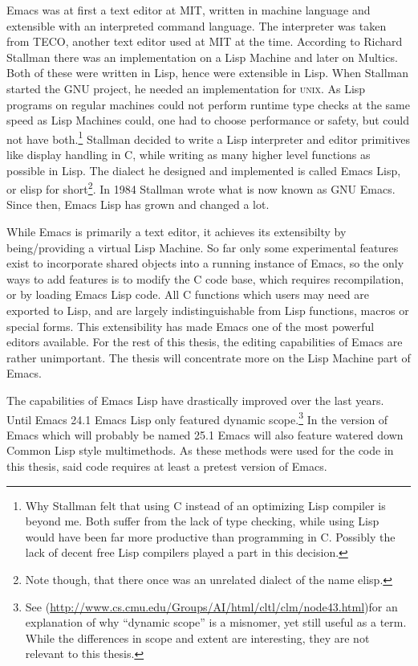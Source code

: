 \documentclass[a4paper,10pt,twoside]{article}
\newcommand{\el}{Emacs Lisp}
\newcommand{\cl}{Common Lisp}
\newcommand{\unix}{\textsc{unix}}
\begin{document}
Emacs was at first a text editor at MIT, written in machine language and
extensible with an interpreted command language.  The interpreter was taken from
TECO, another text editor used at MIT at the time.  According to Richard
Stallman \cite{emacs-hist} there was an implementation on a Lisp Machine and
later on Multics.  Both of these were written in Lisp, hence were extensible in
Lisp.  When Stallman started the GNU project, he needed an implementation for
\unix{}.  As Lisp programs on regular machines could not perform runtime type
checks at the same speed as Lisp Machines could, one had to choose performance
or safety, but could not have both.\footnote{Why Stallman felt that using C
  instead of an optimizing Lisp compiler is beyond me.  Both suffer from the
  lack of type checking, while using Lisp would have been far more productive
  than programming in C.  Possibly the lack of decent free Lisp compilers played
  a part in this decision.} Stallman decided to write a Lisp interpreter and
editor primitives like display handling in C, while writing as many higher level
functions as possible in Lisp.  The dialect he designed and implemented is
called \el{}, or elisp for short\footnote{Note though, that there once was an
  unrelated dialect of the name elisp.}.  In 1984 Stallman wrote what is now
known as GNU Emacs\cite{emacs-first-release}. Since then, \el{} has grown and
changed a lot.

While Emacs is primarily a text editor, it achieves its extensibilty by
being/providing a virtual Lisp Machine.  So far only some experimental features
exist to incorporate shared objects into a running instance of Emacs, so the
only ways to add features is to modify the C code base, which requires
recompilation, or by loading \el{} code.  All C functions which users may need
are exported to Lisp, and are largely indistinguishable from Lisp functions,
macros or special forms.  This extensibility has made Emacs one of the most
powerful editors available.  For the rest of this thesis, the editing
capabilities of Emacs are rather unimportant.  The thesis will concentrate more
on the Lisp Machine part of Emacs.

The capabilities of \el{} have drastically improved over the last years.  Until
Emacs 24.1 \el{} only featured dynamic scope\cite{Emacs-Lexical}.\footnote{See
  \cite{CLTL2}
  (\url{http://www.cs.cmu.edu/Groups/AI/html/cltl/clm/node43.html})for an
  explanation of why ``dynamic scope'' is a misnomer, yet still useful as a
  term.  While the differences in scope and extent are interesting, they are not
  relevant to this thesis.}  In the version of Emacs which will probably be
named 25.1 Emacs will also feature watered down \cl{} style multimethods.  As
these methods were used for the code in this thesis, said code requires at least
a pretest version of Emacs\cite{emacs-pretest}.
\end{document}
